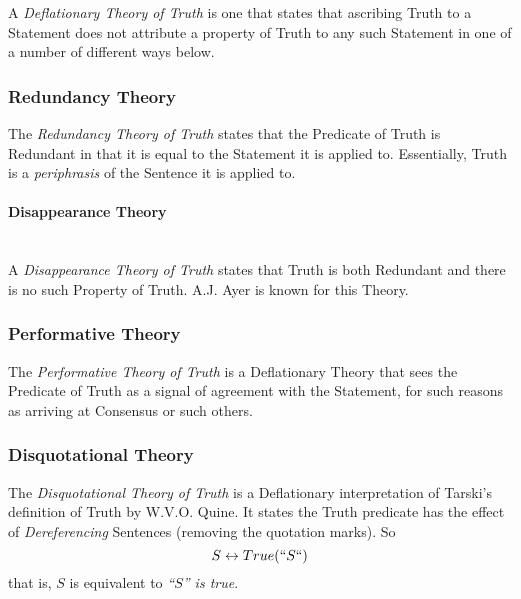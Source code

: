 A \emph{Deflationary Theory of Truth} is one that states that
ascribing Truth to a Statement does not attribute a property of Truth
to any such Statement in one of a number of different ways below.



\subsubsection{Redundancy Theory}\label{sec:redundancy_theory}

The \emph{Redundancy Theory of Truth} states that the Predicate of
Truth is Redundant in that it is equal to the Statement it is applied
to.\cite{ramsey27} Essentially, Truth is a \emph{periphrasis} of the
Sentence it is applied to.



\paragraph{Disappearance Theory}\label{sec:disappearance_theory}
\hfill \\

A \emph{Disappearance Theory of Truth} states that Truth is both
Redundant and there is no such Property of Truth. A.J. Ayer is known
for this Theory.



\subsubsection{Performative Theory}\label{sec:performative_theory}

The \emph{Performative Theory of Truth} is a Deflationary Theory that
sees the Predicate of Truth as a signal of agreement with the
Statement, for such reasons as arriving at Consensus or such others.



\subsubsection{Disquotational Theory}\label{sec:disquotational_theory}

The \emph{Disquotational Theory of Truth} is a Deflationary
interpretation of Tarski's definition of Truth by W.V.O. Quine. It
states the Truth predicate has the effect of \emph{Dereferencing}
Sentences (removing the quotation marks). So
\[
    S \leftrightarrow True(``S``)
\]
that is, $S$ is equivalent to \emph{``$S$'' is true}.

